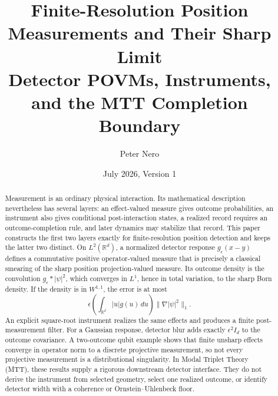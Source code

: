 \documentclass[11pt]{article}
\title{Finite-Resolution Position Measurements and Their Sharp Limit\\
\large Detector POVMs, Instruments, and the MTT Completion Boundary}
\author{Peter Nero}
\date{July 2026, Version 1}
\begin{document}
\maketitle

\begin{abstract}
Measurement is an ordinary physical interaction. Its mathematical
description nevertheless has several layers: an effect-valued measure gives
outcome probabilities, an instrument also gives conditional post-interaction
states, a realized record requires an outcome-completion rule, and later
dynamics may stabilize that record. This paper constructs the first two
layers exactly for finite-resolution position detection and keeps the latter
two distinct. On \(L^2(\mathbb R^d)\), a normalized detector response
\(g_\epsilon(x-y)\) defines a commutative positive operator-valued measure
that is precisely a classical smearing of the sharp position
projection-valued measure. Its outcome density is the convolution
\(g_\epsilon*|\psi|^2\), which converges in \(L^1\), hence in total variation,
to the sharp Born density. If the density is in \(W^{1,1}\), the error is at
most
\[
\epsilon
\left(\int_{\mathbb R^d}|u|g(u)\,du\right)
\|\nabla|\psi|^2\|_1.
\]
An explicit square-root instrument realizes the same effects and produces a
finite post-measurement filter. For a Gaussian response, detector blur adds
exactly \(\epsilon^2 I_d\) to the outcome covariance. A two-outcome qubit
example shows that finite unsharp effects converge in operator norm to a
discrete projective measurement, so not every projective measurement is a
distributional singularity. In Modal Triplet Theory (MTT), these results
supply a rigorous downstream detector interface. They do not derive the
instrument from selected geometry, select one realized outcome, or identify
detector width with a coherence or Ornstein--Uhlenbeck floor.
\end{abstract}
\end{document}
